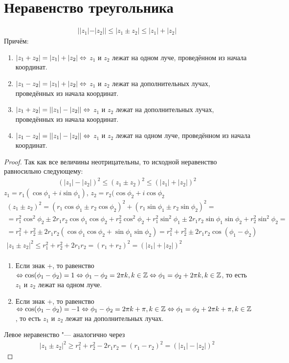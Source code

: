 \section{Неравенство треугольника}

\begin{theorem}{} 
\begin{gather*}
||z_1| - |z_2|| \leqslant |z_1 \pm z_2| \leqslant |z_1| + |z_2|
\end{gather*}
Причём:
\begin{enumerate}
	\item $|z_1 + z_2| = |z_1| + |z_2| \Leftrightarrow$ $z_1$ и $z_2$ лежат на одном луче, проведённом из начала координат.
	\item $|z_1 - z_2| = |z_1| + |z_2| \Leftrightarrow$ $z_1$ и $z_2$ лежат на дополнительных лучах, проведённых из начала координат.
	\item $|z_1 + z_2| = ||z_1| - |z_2|| \Leftrightarrow$ $z_1$ и $z_2$ лежат на дополнительных лучах, проведённых из начала координат.
	\item $|z_1 - z_2| = ||z_1| - |z_2|| \Leftrightarrow$ $z_1$ и $z_2$ лежат на одном луче, проведённом из начала координат.
\end{enumerate} 
\end{theorem}
\begin{proof}
Так как все величины неотрицательны, то исходной неравенство равносильно следующему:
\begin{gather*}
(|z_1|-|z_2|)^2 \leqslant (z_1 \pm z_2)^2 \leqslant (|z_1| + |z_2|)^2
\end{gather*}
$z_1 = r_1(\cos \phi_1 + i \sin \phi_1)$, $z_2 = r_2(\cos \phi_2 + i \cos \phi_2$
\begin{gather*}
(z_1 \pm z_2)^2 = (r_1 \cos \phi_1 \pm r_2 \cos \phi_2)^2 + (r_1 \sin \phi_1 \pm r_2 \sin \phi_2)^2 = \\
= r_1^2 \cos^2 \phi_2 \pm 2r_1r_2 \cos \phi_1 \cos \phi_2 + r_2^2 \cos^2 \phi_2 + r_1^2 \sin^2 \phi_1 \pm 2r_1r_2 \sin \phi_1 \sin \phi_2 + r_2^2 \sin^2 \phi_2 = \\
= r_1^2 + r_2 ^2 \pm 2r_1r_2(\cos \phi_1 \cos \phi_2 + \sin \phi_1 \sin \phi_2) = r_1^2 + r_2^2 \pm 2r_1r_2 \cos(\phi_1 - \phi_2) \\
|z_1 \pm z_2|^2 \leqslant r_1^2 + r_2^2 + 2r_1r_2 = (r_1 + r_2)^2 = (|z_1| + |z_2|)^2 \\
\end{gather*}
\begin{enumerate}
	\item Если знак +, то равенство $\Leftrightarrow \cos(\phi_1 - \phi_2) = 1 \Leftrightarrow \phi_1 - \phi_2 = 2 \pi k, k \in \mathbb{Z} \Leftrightarrow \phi_1 = \phi_2 + 2 \pi k, k \in \mathbb{Z}$, то есть $z_1$ и $z_2$ лежат на одном луче.
	\item Если знак +, то равенство $\Leftrightarrow \cos(\phi_1 - \phi_2) = -1 \Leftrightarrow \phi_1 - \phi_2 = 2 \pi k + \pi, k \in \mathbb{Z} \Leftrightarrow \phi_1 = \phi_2 + 2 \pi k + \pi, k \in \mathbb{Z}$, то есть $z_1$ и $z_2$ лежат на дополнительных лучах.
\end{enumerate}
Левое неравенство "--- аналогично через
\begin{gather*}
|z_1 \pm z_2|^2 \geqslant r_1^2 + r_2^2 - 2r_1r_2 = (r_1 - r_2)^2 = (|z_1| - |z_2|)^2
\end{gather*}
\end{proof}